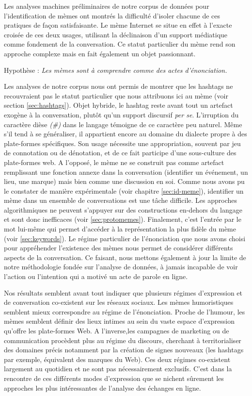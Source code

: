 Les analyses machines préliminaires de notre corpus de données pour l'identification de mèmes ont montrés la difficulté d'isoler chacune de ces pratiques de façon satisfaisante. Le mème Internet se situe en effet à l'exacte croisée de ces deux usages, utilisant la déclinaison d'un support médiatique comme fondement de la conversation. Ce statut particulier du mème rend son approche complexe mais en fait également un objet passionnant. 

Hypothèse : \textit{Les mèmes sont à comprendre comme des actes d'énonciation.}

Les analyses de notre corpus nous ont permis de montrer que les hashtags ne recouvraient pas le statut particulier que nous attribuons ici au mème (voir section \ref{sec:hashtags}). Objet hybride, le hashtag reste avant tout un artefact exogène à la conversation, plutôt qu'un support discursif \textit{per se}. L'irruption du caractère dièse \textit{(\#)} dans le langage témoigne de ce caractère peu naturel. Même s'il tend à se généraliser, il appartient encore au domaine du dialecte propre à des plate-formes spécifiques. Son usage nécessite une appropriation, souvent par jeu de connotation ou de dénotation, et de ce fait participe d'une sous-culture des plate-formes web. A l'opposé, le mème ne se construit pas comme artefact remplissant une fonction annexe dans la conversation (identifier un événement, un lieu, une marque) mais bien comme une discussion en soi. Comme nous avons pu le constater de manière expérimentale (voir chapitre \ref{sec:id-meme}), identifier un mème dans un ensemble de conversations est une tâche difficile. Les approches algorithmiques ne peuvent s'appuyer sur des constructions en-dehors du langage et sont donc inefficaces (voir \ref{sec:protomemes}). Finalement, c'est l'entrée par le mot lui-même qui permet d'accéder à la représentation la plus fidèle du mème (voir \ref{sec:keywords}). Le régime particulier de l'énonciation que nous avons choisi pour appréhender l'existence des mèmes nous permet de considérer différents aspects de la conversation. Ce faisant, nous mettons également à jour la limite de notre méthodologie fondée sur l'analyse de données, à jamais incapable de voir l'action ou l'intention qui a motivé un acte de parole en ligne. 

Nos résultats semblent avant tout indiquer que plusieurs régimes d'expression et de conversation co-existent sur les réseaux sociaux. Les mèmes humoristiques semblent mieux correspondre au régime de l'énonciation. Proche de l'humour, les mèmes semblent définir des lieux intimes au sein du vaste espace d'expression qu'offre les plate-formes Web. A l'inverse,les campagnes de marketing ou de communication procèdent plus au régime du discours, cherchant à territorialiser des domaines précis notamment par la création de signes nouveaux (les hashtags par exemple, équivalent des marques du Web). Ces deux régimes co-existent largement au quotidien et ne sont pas nécessairement exclusifs. C'est dans la rencontre de ces différents modes d'expression que se nichent sûrement les approches les plus intéressantes de l'analyse des échanges en ligne.

